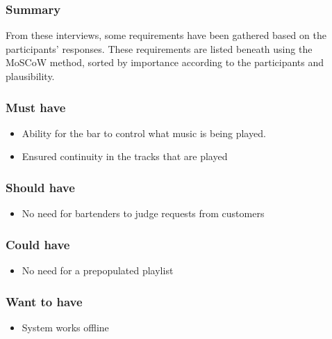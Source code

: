 
\subsubsection{Summary}
\label{sub:summary}
From these interviews, some requirements have been gathered based on the participants' responses. These requirements are listed beneath using the MoSCoW method, sorted by importance according to the participants and plausibility.
\subsubsection{Must have}
\begin{itemize}
        \item Ability for the bar to control what music is being played.
        \item Ensured continuity in the tracks that are played
\end{itemize}
\subsubsection{Should have}
\begin{itemize}
        \item No need for bartenders to judge requests from customers
\end{itemize}
\subsubsection{Could have}
\begin{itemize}
        \item No need for a prepopulated playlist
\end{itemize}
\subsubsection{Want to have}
\begin{itemize}
        \item System works offline
\end{itemize}
